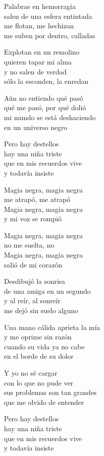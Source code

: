 \begin{lyrics}

Palabras en hemorragia\\
salen de una esfera entintada\\
me flotan, me hechizan\\
me suben por dentro, calladas

Explotan en un remolino\\
quieren tapar mi alma\\
y no salen de verdad\\
sólo la esconden, la enredan

Aún no entiendo qué pasó\\
qué me pasó, por qué dolió\\
mi mundo se está deshaciendo\\
en un universo negro

Pero hay destellos\\
hay una niña triste\\
que en mis recuerdos vive\\
y todavía insiste

Magia negra, magia negra\\
me atrapó, me atrapó\\
Magia negra, magia negra\\
y mi voz se rompió

Magia negra, magia negra\\
no me suelta, no\\
Magia negra, magia negra\\
salió de mi corazón

Desdibujó la sonrisa\\
de una amiga en un segundo\\
y al reír, al sonreír\\
me dejó sin suelo alguno

Una mano cálida aprieta la mía\\
y me oprime sin razón\\
cuando su vida ya no cabe\\
en el borde de su dolor

Y yo no sé cargar\\
con lo que no pude ver\\
sus problemas son tan grandes\\
que me olvido de entender

Pero hay destellos\\
hay una niña triste\\
que en mis recuerdos vive\\
y todavía insiste


\end{lyrics}
